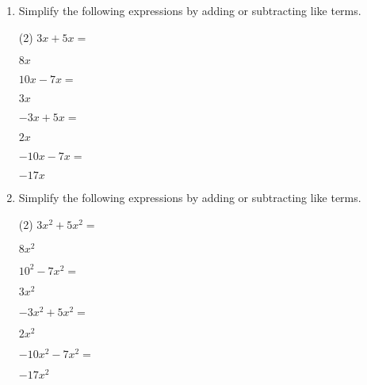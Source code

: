 \clearpage
\begin{enumerate} [leftmargin=0cm] 

\item Simplify the following expressions by adding or subtracting like terms.
\begin{tasks}[label=(\alph*), after-item-skip=2pt,after-skip=3pt, label-width=4ex](2)
    \task  $ 3x+5x=           $                               \begin{envFillIn} $  8x         $ \end{envFillIn}
    \task  $ 10x-7x=          $                               \begin{envFillIn} $  3x         $ \end{envFillIn}
    \task  $ -3x+5x=          $                               \begin{envFillIn} $  2x         $ \end{envFillIn}
    \task  $ -10x-7x=         $                               \begin{envFillIn} $  -17x       $ \end{envFillIn} 
\end{tasks}

\item Simplify the following expressions by adding or subtracting like terms.
\begin{tasks}[label=(\alph*), after-item-skip=2pt,after-skip=3pt, label-width=4ex](2)
    \task  $ 3x^2+5x^2=           $                               \begin{envFillIn} $  8x^2         $ \end{envFillIn}
    \task  $ 10^2-7x^2=           $                               \begin{envFillIn} $  3x^2         $ \end{envFillIn}
    \task  $ -3x^2+5x^2=          $                               \begin{envFillIn} $  2x^2         $ \end{envFillIn}
    \task  $ -10x^2-7x^2=         $                               \begin{envFillIn} $  -17x^2       $ \end{envFillIn} 
\end{tasks}


\end{enumerate}
